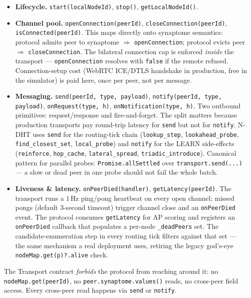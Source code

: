 \documentclass[twoside,nobib]{tufte-book}
\newcommand{\NDHT}{N-DHT\xspace}
\begin{document}
\begin{itemize}\itemsep2pt
\item \textbf{Lifecycle.} \texttt{start(localNodeId)},
  \texttt{stop()}, \texttt{getLocalNodeId()}.
\item \textbf{Channel pool.} \texttt{openConnection(peerId)},
  \texttt{closeConnection(peerId)},
  \texttt{isConnected(peerId)}. This maps directly onto
  synaptome semantics: protocol admits peer to synaptome
  $\Rightarrow$ \texttt{openConnection}; protocol evicts peer
  $\Rightarrow$ \texttt{closeConnection}. The bilateral
  connection cap is enforced \emph{inside} the transport ---
  \texttt{openConnection} resolves with \texttt{false} if the
  remote refused. Connection-setup cost (WebRTC ICE/DTLS
  handshake in production, free in the simulator) is paid here,
  once per peer, not per message.
\item \textbf{Messaging.} \texttt{send(peerId, type,
  payload)}, \texttt{notify(peerId, type, payload)},
  \texttt{onRequest(type, h)}, \texttt{onNotification(type, h)}.
  Two outbound primitives: request/response and fire-and-forget.
  The split matters because production transports pay round-trip
  latency for \texttt{send} but not for \texttt{notify}. \NDHT
  uses \texttt{send} for the routing-tick chain
  (\texttt{lookup\_step}, \texttt{lookahead\_probe},
  \texttt{find\_closest\_set}, \texttt{local\_probe}) and
  \texttt{notify} for the LEARN side-effects
  (\texttt{reinforce}, \texttt{hop\_cache},
  \texttt{lateral\_spread}, \texttt{triadic\_introduce}).
  Canonical pattern for parallel probes:
  \texttt{Promise.allSettled} over \texttt{transport.send(...)}
  --- a slow or dead peer in one probe should not fail the whole
  batch.
\item \textbf{Liveness \& latency.} \texttt{onPeerDied(handler)},
  \texttt{getLatency(peerId)}. The transport runs a $1$\,Hz
  ping/pong heartbeat on every open channel; missed pongs
  (default $3$-second timeout) trigger channel close and an
  \texttt{onPeerDied} event. The protocol consumes
  \texttt{getLatency} for AP scoring and registers an
  \texttt{onPeerDied} callback that populates a per-node
  \texttt{\_deadPeers} set. The candidate-enumeration step in
  every routing tick filters against that set --- the same
  mechanism a real deployment uses, retiring the legacy god's-eye
  \texttt{nodeMap.get(p)?.alive} check.
\end{itemize}

The Transport contract \emph{forbids} the protocol from
reaching around it: no \texttt{nodeMap.get(peerId)}, no
\texttt{peer.synaptome.values()} reads, no cross-peer field
access. Every cross-peer read happens via \texttt{send} or
\texttt{notify}.
\end{document}

